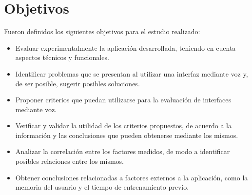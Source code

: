\section{Objetivos}
\label{sec:objetivos-estudio}

Fueron definidos los siguientes objetivos para el estudio realizado:

\begin{itemize}
	\item Evaluar experimentalmente la aplicaci\'on desarrollada, teniendo en cuenta 
	aspectos t\'ecnicos y funcionales.
	\item Identificar problemas que se presentan al utilizar una interfaz mediante voz y,
	 de ser posible, sugerir posibles soluciones.
	\item Proponer criterios que puedan utilizarse para la evaluaci\'on de interfaces 
	mediante voz.
	\item Verificar y validar la utilidad de los criterios propuestos, de acuerdo a 
	la informaci\'on y las conclusiones que pueden obtenerse mediante los mismos.
	\item Analizar la correlación entre los factores medidos, de modo a identificar
	posibles relaciones entre los mismos. 
	\item Obtener conclusiones relacionadas a factores externos a la aplicaci\'on, 
	como la memoria del usuario y el tiempo de entrenamiento previo.
\end{itemize}